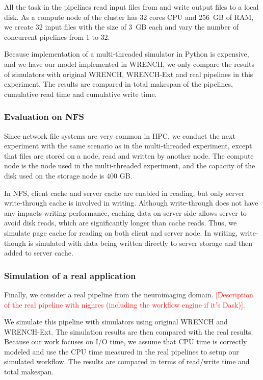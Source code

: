 \documentclass[conference]{IEEEtran}
\begin{document}
			All the task in the pipelines read input files from and write output files 
			to a local disk. 
			As a compute node of the cluster has 32 cores CPU and 256~GB of RAM,  
			we create 32 input files with the size of 3~GB each and vary the number of 
			concurrent pipelines from 1 to 32. 
			
			Because implementation of a multi-threaded simulator in Python is 
			expensive, and we have our model implemented in WRENCH, 
			we only compare the results of simulators with original WRENCH, 
			WRENCH-Ext and real pipelines in this experiment. 
			The results are compared in total makespan of the pipelines, 
			cumulative read time and cumulative write time.
			
			\subsubsection{Evaluation on NFS}
			
		    Since network file systems are very common in HPC, we conduct 
		    the next experiment with the same scenario as in the multi-threaded experiment, 
		    except that files are stored on a node, read and written by another node. 
		    The compute node is the node used in the multi-threaded experiment, 
		    and the capacity of the disk used on the storage node is 400 GB.
		    
		    In NFS, client cache and server cache are enabled in reading, but only 
		    server write-through cache is involved in writing. 
		    Although write-through does not have any impacts writing performance, 
		    caching data on server side allows server to avoid disk reads, which are 
		    significantly longer than cache reads.
		    Thus, we simulate page cache for reading on both client and server node.
		    In writing, write-though is simulated with data being written directly to 
		    server storage and then added to server cache. 
		    
		    \subsubsection{Simulation of a real application}

		    Finally, we consider a real pipeline from the neuroimaging domain. 			
			\textcolor{red}{[Description of the real pipeline with nighres 
			(including the workflow engine if it's Dask)]}.  			
			
			We simulate this pipeline with simulators using original WRENCH and 
			WRENCH-Ext. 
			The simulation results are then compared with the real results. 
			Because our work focuses on I/O time, we assume that CPU time is 
			correctly modeled and use the CPU time measured in the real pipelines 
			to setup our simulated workflow. The results are compared in terms of 
			read/write time and total makespan.
\end{document}
